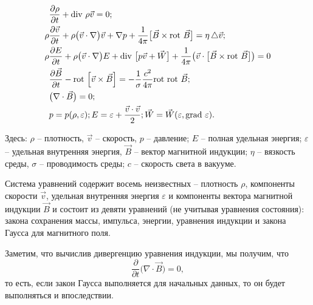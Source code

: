 \documentclass[14pt, a4paper, fleqn]{extreport}
\begin{document}
    \begin{equation}
    \label{mhd_system}
    \begin{split}
        &\dfrac{\partial \rho}{\partial t}
            + \text{div }{ \rho\vec{v} } = 0; \\
        \rho&\dfrac{\partial \vec{v}}{\partial t}
            + \rho\big( \vec{v} \cdot \nabla \big) \vec{v} + \nabla p
            + \dfrac{1}{4\pi}\big[ \vec{B} \times \text{rot }{\vec{B}} \big]
            = \eta\mathop{}\!\mathbin\bigtriangleup \vec{v}; \\
        \rho&\dfrac{\partial E}{\partial t} 
            + \rho\big( \vec{v} \cdot \nabla \big)E
            + \text{div }{\big[ p\vec{v} + \vec{W} \big]} 
            + \dfrac{1}{4\pi} \big( \vec{v} \cdot \big[ \vec{B} \times \text{rot }{\vec{B}} \big] \big) = 0\\            
        &\dfrac{\partial \vec{B}}{\partial t}
            - \text{rot }{\Big[ \vec{v} \times \vec{B} \Big]}
            = -\dfrac{1}{\sigma}\dfrac{c^2}{4\pi}\text{rot }{\text{rot }{\vec{B}}}; \\
        &\big( \nabla \cdot \vec{B} \big) = 0; \\
        &p = p(\rho, \varepsilon); 
         E = \varepsilon + \dfrac{\vec{v} \cdot \vec{v}}{2}; 
         \vec{W} = \vec{W}(\varepsilon, \text{grad }{\varepsilon}).
    \end{split}
    \end{equation}
    
    Здесь:
    $\rho$ -- плотность, $\vec{v}$ -- скорость, $p$ -- давление;
    $E$ -- полная удельная энергия; $\varepsilon$ -- удельная внутренняя энергия, 
    $\vec{B}$ -- вектор магнитной индукции;
    $\eta$ -- вязкость среды, $\sigma$ -- проводимость среды;
    $c$ -- скорость света в вакууме.
    
    Система уравнений содержит восемь неизвестных -- плотность $\rho$,
    компоненты скорости $\vec{v}$, удельная внутренняя энергия $\varepsilon$
    и компоненты вектора магнитной индукции $\vec{B}$
    и состоит из девяти уравнений (не учитывая уравнения состояния):
    закона сохранения массы, импульса, энергии, уравнения индукции 
    и закона Гаусса для магнитного поля.
    
    Заметим, что вычислив дивергенцию уравнения индукции, мы получим, что
    \begin{equation*}
        \dfrac{\partial}{\partial t} \big( \nabla \cdot \vec{B} \big) = 0,
    \end{equation*}
    то есть, если закон Гаусса выполняется для начальных данных, то
    он будет выполняться и впоследствии.
\end{document}
